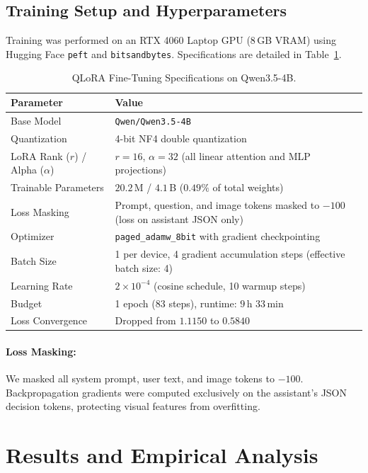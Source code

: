 ﻿\documentclass[11pt,a4paper]{article}
\begin{document}
\subsection{Training Setup and Hyperparameters}
Training was performed on an RTX 4060 Laptop GPU (8\,GB VRAM) using Hugging Face \texttt{peft} and \texttt{bitsandbytes}. Specifications are detailed in Table~\ref{tab:training_specifications}.

\begin{table}[htbp]
\centering
\small
\caption{QLoRA Fine-Tuning Specifications on Qwen3.5-4B.}
\label{tab:training_specifications}
\begin{tabular*}{\textwidth}{@{\extracolsep{\fill}}ll@{}}
\toprule
\textbf{Parameter} & \textbf{Value} \\
\midrule
Base Model & \texttt{Qwen/Qwen3.5-4B} \\
Quantization & 4-bit NF4 double quantization \\
LoRA Rank ($r$) / Alpha ($\alpha$) & $r=16$, $\alpha=32$ (all linear attention and MLP projections) \\
Trainable Parameters & $20.2$\,M / $4.1$\,B ($0.49\%$ of total weights) \\
Loss Masking & Prompt, question, and image tokens masked to $-100$ (loss on assistant JSON only) \\
Optimizer & \texttt{paged\_adamw\_8bit} with gradient checkpointing \\
Batch Size & 1 per device, 4 gradient accumulation steps (effective batch size: 4) \\
Learning Rate & $2 \times 10^{-4}$ (cosine schedule, 10 warmup steps) \\
Budget & 1 epoch ($83$ steps), runtime: $9$\,h $33$\,min \\
Loss Convergence & Dropped from $1.1150$ to $0.5840$ \\
\bottomrule
\end{tabular*}
\end{table}

\paragraph{Loss Masking:} We masked all system prompt, user text, and image tokens to $-100$. Backpropagation gradients were computed exclusively on the assistant's JSON decision tokens, protecting visual features from overfitting.

\section{Results and Empirical Analysis}
\end{document}
